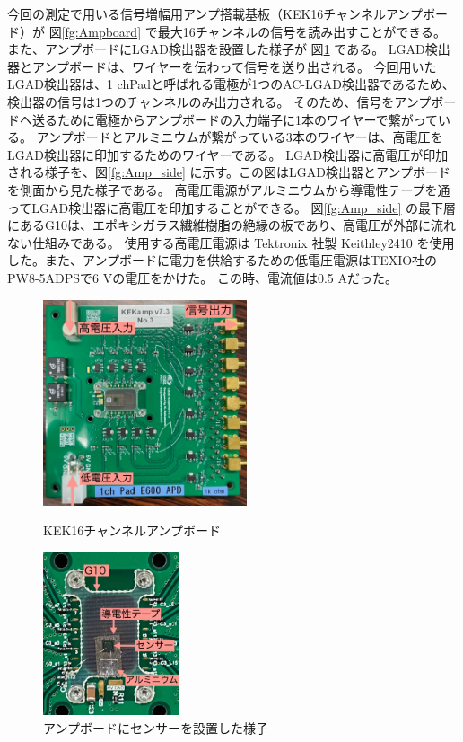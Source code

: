 今回の測定で用いる信号増幅用アンプ搭載基板（KEK16チャンネルアンプボード）が 図\ref{fg:Ampboard} で最大16チャンネルの信号を読み出すことができる。
また、アンプボードにLGAD検出器を設置した様子が 図\ref{fg:Amp_LGAD} である。
LGAD検出器とアンプボードは、ワイヤーを伝わって信号を送り出される。
今回用いたLGAD検出器は、1 chPadと呼ばれる電極が1つのAC-LGAD検出器であるため、検出器の信号は1つのチャンネルのみ出力される。
そのため、信号をアンプボードへ送るために電極からアンプボードの入力端子に1本のワイヤーで繋がっている。
アンプボードとアルミニウムが繋がっている3本のワイヤーは、高電圧をLGAD検出器に印加するためのワイヤーである。
LGAD検出器に高電圧が印加される様子を、図\ref{fg:Amp_side} に示す。この図はLGAD検出器とアンプボードを側面から見た様子である。
高電圧電源がアルミニウムから導電性テープを通ってLGAD検出器に高電圧を印加することができる。
図\ref{fg:Amp_side} の最下層にあるG10は、エポキシガラス繊維樹脂の絶縁の板であり、高電圧が外部に流れない仕組みである。
使用する高電圧電源は Tektronix 社製 Keithley2410 を使用した。また、アンプボードに電力を供給するための低電圧電源はTEXIO社のPW8-5ADPSで6 Vの電圧をかけた。
この時、電流値は0.5 Aだった。

\begin{figure}[h]
    \begin{minipage}[b]{0.5\linewidth}
        \centering
        \includegraphics[width=6cm]{fig/ch4/Ampboard.jpeg}
        \caption{KEK16チャンネルアンプボード}
        \label{fg:Ampboard}
    \end{minipage}
    \begin{minipage}[b]{0.5\linewidth}
        \centering
        \includegraphics[width=4cm]{fig/ch4/Amp_LGAD.jpg}
        \caption{アンプボードにセンサーを設置した様子}
        \label{fg:Amp_LGAD}
    \end{minipage}
\end{figure}

